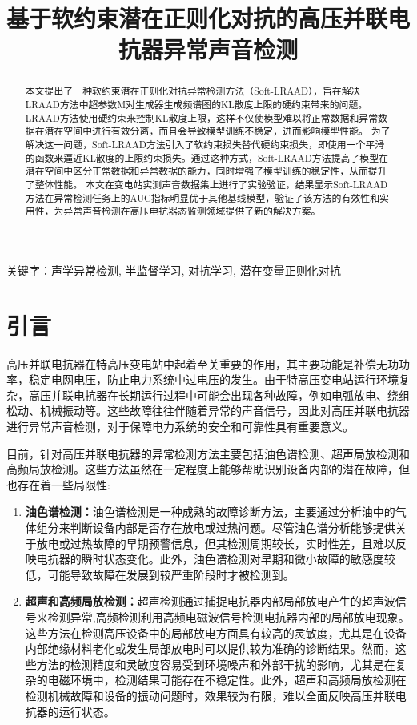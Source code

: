 \documentclass{article}
\title{基于软约束潜在正则化对抗的高压并联电抗器异常声音检测}
\begin{document}
\maketitle

\begin{abstract}
  本文提出了一种软约束潜在正则化对抗异常检测方法（Soft-LRAAD），旨在解决LRAAD方法中超参数M对生成器生成频谱图的KL散度上限的硬约束带来的问题。LRAAD方法使用硬约束来控制KL散度上限，这样不仅使模型难以将正常数据和异常数据在潜在空间中进行有效分离，而且会导致模型训练不稳定，进而影响模型性能。
  为了解决这一问题，Soft-LRAAD方法引入了软约束损失替代硬约束损失，即使用一个平滑的函数来逼近KL散度的上限约束损失。通过这种方式，Soft-LRAAD方法提高了模型在潜在空间中区分正常数据和异常数据的能力，同时增强了模型训练的稳定性，从而提升了整体性能。
本文在变电站实测声音数据集上进行了实验验证，结果显示Soft-LRAAD方法在异常检测任务上的AUC指标明显优于其他基线模型，验证了该方法的有效性和实用性，为异常声音检测在高压电抗器态监测领域提供了新的解决方案。
\end{abstract}


关键字：声学异常检测, 半监督学习, 对抗学习, 潜在变量正则化对抗

\section{引言}

高压并联电抗器在特高压变电站中起着至关重要的作用，其主要功能是补偿无功功率，稳定电网电压，防止电力系统中过电压的发生\cite{das2017novel,magdaleno2014temperature,tumay2017review}。由于特高压变电站运行环境复杂，高压并联电抗器在长期运行过程中可能会出现各种故障，例如电弧放电、绕组松动、机械振动等\cite{yao2015noninvasive,velasquez2019root}。这些故障往往伴随着异常的声音信号，因此对高压并联电抗器进行异常声音检测，对于保障电力系统的安全和可靠性具有重要意义。

目前，针对高压并联电抗器的异常检测方法主要包括油色谱检测、超声局放检测和高频局放检测。这些方法虽然在一定程度上能够帮助识别设备内部的潜在故障，但也存在着一些局限性:

\begin{enumerate}

  \item{\textbf{油色谱检测：}油色谱检测是一种成熟的故障诊断方法，主要通过分析油中的气体组分来判断设备内部是否存在放电或过热问题\cite{ali2023conventional}。尽管油色谱分析能够提供关于放电或过热故障的早期预警信息，但其检测周期较长，实时性差，且难以反映电抗器的瞬时状态变化。此外，油色谱检测对早期和微小故障的敏感度较低，可能导致故障在发展到较严重阶段时才被检测到。}

  \item{\textbf{超声和高频局放检测：}超声检测通过捕捉电抗器内部局部放电产生的超声波信号来检测异常\cite{wang2018partial},高频检测利用高频电磁波信号检测电抗器内部的局部放电现象\cite{zheng2020feasibility}。这些方法在检测高压设备中的局部放电方面具有较高的灵敏度，尤其是在设备内部绝缘材料老化或发生局部放电时可以提供较为准确的诊断结果。然而，这些方法的检测精度和灵敏度容易受到环境噪声和外部干扰的影响，尤其是在复杂的电磁环境中，检测结果可能存在不稳定性。此外，超声和高频局放检测在检测机械故障和设备的振动问题时，效果较为有限，难以全面反映高压并联电抗器的运行状态。}

\end{enumerate}
\end{document}
